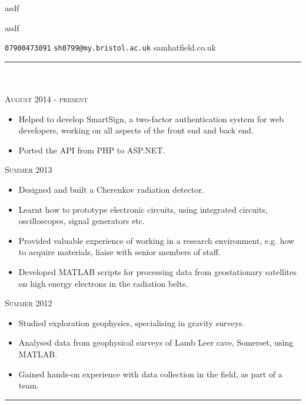 \documentclass[10pt]{article}
\begin{document}
\LARGE\centerline{asdf}
\normalsize \centerline{asdf}
\centerline{\texttt{07900473091}   \hspace{3mm} \texttt{sh0799@my.bristol.ac.uk}\hspace{3mm} samhatfield.co.uk}
\noindent

\noindent\rule{505pt}{0.6pt}\\
\\
 \hfill \textsc{August 2014 - present}
\begin{itemize}
\item Helped to develop SmartSign, a two-factor authentication system for web developers, working on all aspects of the front end and back end. 
\item Ported the API from PHP to ASP.NET.
\end{itemize}

 \hfill \textsc{Summer 2013}
\begin{itemize}
		\item Designed and built a Cherenkov radiation detector. 
		\item Learnt how to prototype electronic circuits, using integrated circuits, oscilloscopes, signal generators etc.
		\item Provided valuable experience of working in a research environment, e.g. how to acquire materials, liaise with senior members of staff.
		\item Developed MATLAB scripts for processing data from geostationary satellites on high energy electrons in the radiation belts.
		\end{itemize}

 \hfill \textsc{Summer 2012}
\begin{itemize}
		\item Studied exploration geophysics, specialising in gravity surveys.
		\item Analysed data from geophysical surveys of Lamb Leer cave, Somerset, using MATLAB.
		\item Gained hands-on experience with data collection in the field, as part of a team. 
\end{itemize}

\noindent\rule{505pt}{0.6pt}
\end{document}
